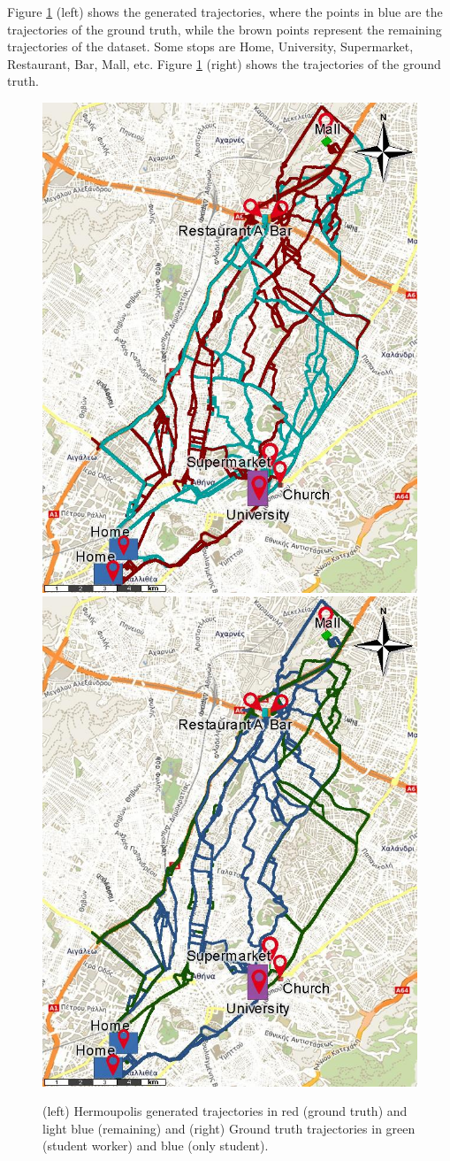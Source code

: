 {Figure {\ref{fig:hermoupolis_groundtruth}} (left) shows the generated trajectories, where the points in blue are the trajectories of the ground truth, while the brown points represent the remaining trajectories of the dataset. Some stops are Home, University, Supermarket, Restaurant, Bar, Mall, etc.
Figure {\ref{fig:hermoupolis_groundtruth}} (right) shows the trajectories of the ground truth.}

\begin{figure}[ht!]
\centerline{
\centering
\includegraphics[width=.5\textwidth]{Images/Hermoupolis-RawPoints.jpg}
\includegraphics[width=.5\textwidth]{Images/Hermoupolis-CommercialCenter.jpg}
}
\caption{(left) Hermoupolis generated trajectories in red (ground truth) and light blue (remaining) and (right) Ground truth trajectories in green (student worker) and blue (only student).}
\label{fig:hermoupolis_groundtruth}
\end{figure}

